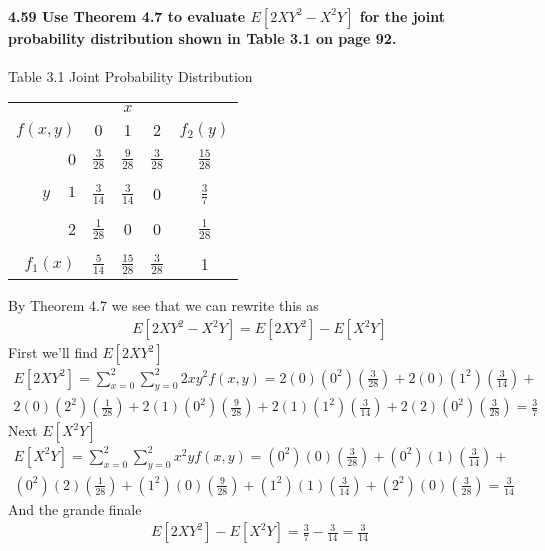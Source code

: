 \documentclass{article}
\begin{document}
\paragraph{4.59 Use Theorem 4.7 to evaluate $E[2XY^2-X^2Y]$ for the joint 
probability distribution shown in Table 3.1 on page 92.}
\begin{center}
Table 3.1 Joint Probability Distribution\\
\begin{tabular}{r|c c c|c}
& & $x$ &\\
$f(x,y)$ & 0 & 1 & 2 & $f_2(y)$\\
\hline
0 & $\frac{3}{28}$ & $\frac{9}{28}$ & $\frac{3}{28}$ & $\frac{15}{28}$\\
 & & & &\\
$y\;\;\;\;1$ & $\frac{3}{14}$ & $\frac{3}{14}$ & 0 & $\frac{3}{7}$\\
 & & & &\\
2 & $\frac{1}{28}$ & 0 & 0 & $\frac{1}{28}$\\
 & & & &\\
\hline
$f_1(x)$ & $\frac{5}{14}$ & $\frac{15}{28}$ & $\frac{3}{28}$ & 1
\end{tabular}\end{center}
By Theorem 4.7 we see that we can rewrite this as
\begin{eqnarray*}
E[2XY^2-X^2Y] = E[2XY^2]-E[X^2Y]
\end{eqnarray*}
First we'll find $E[2XY^2]$
\begin{eqnarray*}
E[2XY^2] = \sum_{x=0}^2\sum_{y=0}^2 2xy^2f(x,y) = 
	2(0)(0^2)\left(\frac{3}{28}\right) + 2(0)(1^2)\left(\frac{3}{14}\right) +\\ 
	2(0)(2^2)\left(\frac{1}{28}\right) + 2(1)(0^2)\left(\frac{9}{28}\right) +
	2(1)(1^2)\left(\frac{3}{14}\right) + 2(2)(0^2)\left(\frac{3}{28}\right)
	= \frac{3}{7}
\end{eqnarray*}
Next $E[X^2Y]$
\begin{eqnarray*}
E[X^2Y] = \sum_{x=0}^2\sum_{y=0}^2 x^2yf(x,y) = 
	(0^2)(0)\left(\frac{3}{28}\right) + (0^2)(1)\left(\frac{3}{14}\right) +\\
	(0^2)(2)\left(\frac{1}{28}\right) + (1^2)(0)\left(\frac{9}{28}\right) +
	(1^2)(1)\left(\frac{3}{14}\right) + (2^2)(0)\left(\frac{3}{28}\right)
	= \frac{3}{14}
\end{eqnarray*}
And the grande finale
\begin{eqnarray*}
E[2XY^2]-E[X^2Y] = \frac{3}{7}-\frac{3}{14}=\boxed{\frac{3}{14}}
\end{eqnarray*}
\end{document}
